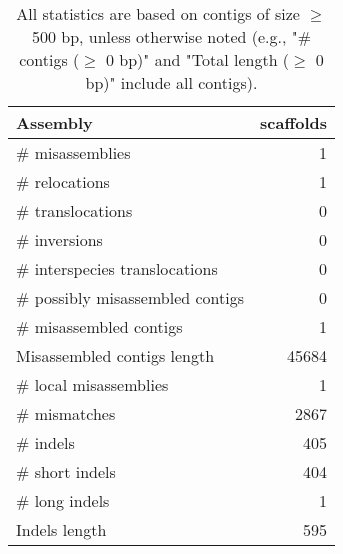\documentclass[12pt,a4paper]{article}
\begin{document}
\begin{table}[ht]
\begin{center}
\caption{All statistics are based on contigs of size $\geq$ 500 bp, unless otherwise noted (e.g., "\# contigs ($\geq$ 0 bp)" and "Total length ($\geq$ 0 bp)" include all contigs).}
\begin{tabular}{|l*{1}{|r}|}
\hline
Assembly & scaffolds \\ \hline
\# misassemblies & 1 \\ \hline
\hspace{5mm}\# relocations & 1 \\ \hline
\hspace{5mm}\# translocations & 0 \\ \hline
\hspace{5mm}\# inversions & 0 \\ \hline
\hspace{5mm}\# interspecies translocations & 0 \\ \hline
\# possibly misassembled contigs & 0 \\ \hline
\# misassembled contigs & 1 \\ \hline
Misassembled contigs length & 45684 \\ \hline
\# local misassemblies & 1 \\ \hline
\# mismatches & 2867 \\ \hline
\# indels & 405 \\ \hline
\hspace{5mm}\# short indels & 404 \\ \hline
\hspace{5mm}\# long indels & 1 \\ \hline
Indels length & 595 \\ \hline
\end{tabular}
\end{center}
\end{table}
\end{document}
